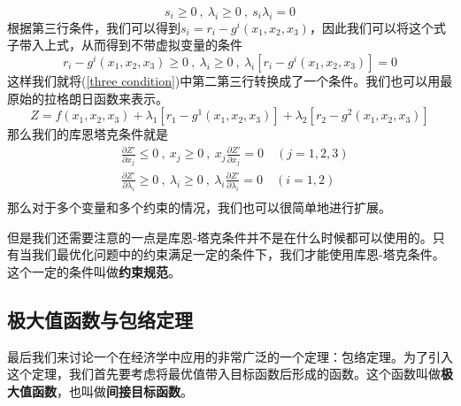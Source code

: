 \documentclass[UTF8,12pt]{ctexart}
\numberwithin{equation}{section} %
\numberwithin{figure}{section}
\numberwithin{table}{section}
\begin{document}
	\begin{equation}
		s_i \geqslant 0 \ , \ \lambda_i \geqslant 0 \ , \ s_i\lambda_i = 0
	\end{equation}
	根据第三行条件，我们可以得到$s_i = r_i - g^i(x_1,x_2,x_3)$，因此我们可以将这个式子带入上式，从而得到不带虚拟变量的条件
	\begin{equation}
		r_i - g^i(x_1,x_2,x_3) \geqslant 0 \ , \ \lambda_i \geqslant 0 \ , \ \lambda_i[r_i - g^i(x_1,x_2,x_3)] = 0
	\end{equation}
	这样我们就将(\ref{three condition})中第二第三行转换成了一个条件。我们也可以用最原始的拉格朗日函数来表示。
	\begin{equation}
		Z = f(x_1,x_2,x_3) + \lambda_1[r_1 - g^1(x_1,x_2,x_3)] + \lambda_2[r_2 - g^2(x_1,x_2,x_3) ]
	\end{equation}
	那么我们的库恩塔克条件就是
	\begin{equation}
		\begin{aligned}
			&\frac{\partial Z'}{\partial x_j} \leqslant 0 \ , \ x_j \geqslant 0 \ , \ x_j\frac{\partial Z'}{\partial x_j} = 0 \quad (j = 1,2,3)\\
			&\frac{\partial Z'}{\partial \lambda_i} \geqslant 0 \ , \ \lambda_i \geqslant 0 \ , \ \lambda_i\frac{\partial Z'}{\partial \lambda_i} = 0 \quad (i = 1,2)\\
		\end{aligned}
	\end{equation}
	那么对于多个变量和多个约束的情况，我们也可以很简单地进行扩展。
	
	但是我们还需要注意的一点是库恩-塔克条件并不是在什么时候都可以使用的。只有当我们最优化问题中的约束满足一定的条件下，我们才能使用库恩-塔克条件。这个一定的条件叫做\textbf{约束规范}。
	
	\subsection{极大值函数与包络定理}
	最后我们来讨论一个在经济学中应用的非常广泛的一个定理：包络定理。为了引入这个定理，我们首先要考虑将最优值带入目标函数后形成的函数。这个函数叫做\textbf{极大值函数}，也叫做\textbf{间接目标函数}。
	
\end{document}
